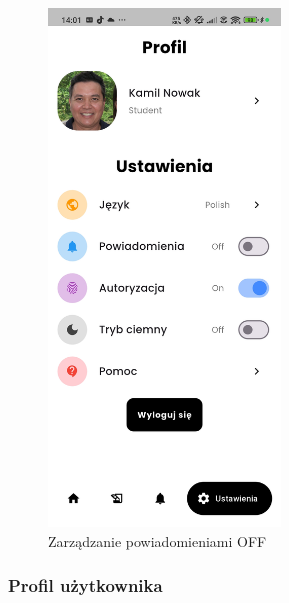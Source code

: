 \begin{figure}[h!]
	\centering
	\includegraphics[width=0.55\textwidth]{rys/app_notifications_off.jpg}
	\caption{Zarządzanie powiadomieniami OFF}
	\label{rys:notificationOFF}
\end{figure}

\newpage
\subsubsection{Profil użytkownika}

